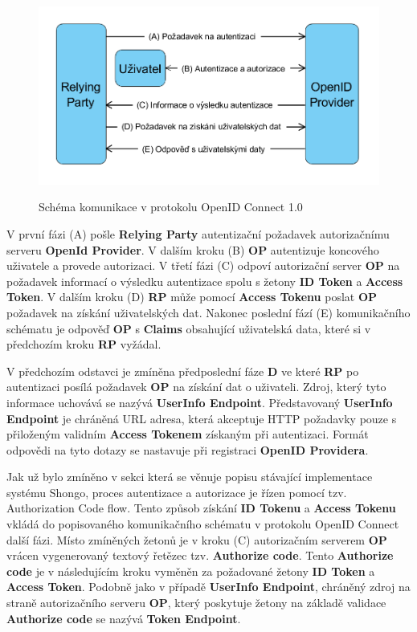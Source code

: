 \documentclass[
  printed, %
  twoside, %
  table,   %
  nolof,     %
  nolot,     %
]{fithesis3}
\begin{document}
\begin{figure}[H]
\caption{Schéma komunikace v protokolu OpenID Connect 1.0}
\centering
\includegraphics[width=12.8cm]{pics/diplomkaOIDC} 
\label{fig:oidc}
\end{figure}
\par 

V první fázi (A) pošle \textbf{Relying Party} autentizační požadavek autorizačnímu serveru \textbf{OpenId Provider}. V dalším kroku (B) \textbf{OP} autentizuje koncového uživatele a provede autorizaci. V třetí fázi (C) odpoví autorizační server \textbf{OP} na požadavek informací o výsledku autentizace spolu s žetony \textbf{ID Token} a \textbf{Access Token}. V dalším kroku (D) \textbf{RP} může pomocí \textbf{Access Tokenu} poslat \textbf{OP} požadavek na získání uživatelských dat. Nakonec poslední fází (E) komunikačního schématu je odpověď \textbf{OP} s \textbf{Claims} obsahující uživatelská data, které si v předchozím kroku \textbf{RP} vyžádal. \par

V předchozím odstavci je zmíněna předposlední fáze \textbf{D} ve které \textbf{RP} po autentizaci posílá požadavek \textbf{OP} na získání dat o uživateli. Zdroj, který tyto informace uchovává se nazývá \textbf{UserInfo Endpoint}. Představovaný \textbf{UserInfo Endpoint} je chráněná URL adresa, která akceptuje HTTP požadavky pouze s přiloženým validním \textbf{Access Tokenem} získaným při autentizaci. Formát odpovědi na tyto dotazy se nastavuje při registraci \textbf{OpenID Providera}.  \par

Jak už bylo zmíněno v sekci která se věnuje popisu stávající implementace systému Shongo, proces autentizace a autorizace je řízen pomocí tzv. Authorization Code flow. Tento způsob získání \textbf{ID Tokenu} a \textbf{Access Tokenu} vkládá do popisovaného komunikačního schématu v protokolu OpenID Connect další fázi. Místo zmíněných žetonů je v kroku (C) autorizačním serverem \textbf{OP} vrácen vygenerovaný textový řetězec tzv. \textbf{Authorize code}. Tento \textbf{Authorize code} je v následujícím kroku vyměněn za požadované žetony \textbf{ID Token} a \textbf{Access Token}. Podobně jako v případě \textbf{UserInfo Endpoint}, chráněný zdroj na straně autorizačního serveru \textbf{OP}, který poskytuje žetony na základě validace \textbf{Authorize code} se nazývá \textbf{Token Endpoint}.
\end{document}
